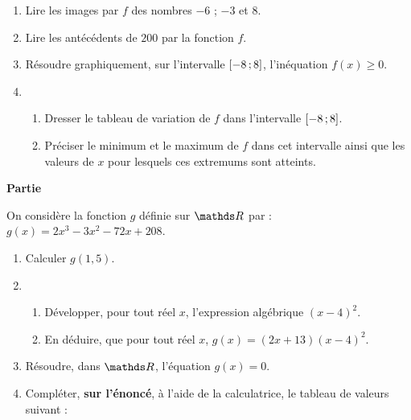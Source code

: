 \documentclass[12pt,french]{article}
\begin{document}
\begin{enumerate}[label=\arabic*.]
\item Lire les images par $f$ des nombres $-6$ ; $-3$ et $8$.

\item Lire les antécédents de $200$ par la fonction $f$.

\item Résoudre graphiquement, sur l'intervalle $\left[-8\,;8\right]$, l'inéquation $f(x)\geq 0$.

\item 	\begin{enumerate}[label=\alph*)]
	\item Dresser le tableau de variation de $f$ dans l'intervalle $\left[-8\,;8\right]$.
	
	\item Préciser le minimum et le maximum de $f$ dans cet intervalle ainsi que les valeurs de $x$ pour lesquels ces extremums sont atteints.
	
	\end{enumerate}

\end{enumerate}


\medskip\textbf{Partie} 

On considère la fonction $g$ définie sur $\R$ par : $g(x)=2x^3-3x^2-72x+208$.

\begin{enumerate}[label=\arabic*.]
\item Calculer $g(1,5)$.

\item 	\begin{enumerate}[label=\alph*)]
	\item Développer, pour tout réel $x$, l'expression algébrique $(x-4)^2$.
	
	\item En déduire, que pour tout réel $x$, $g(x)=(2x+13)(x-4)^2$.
	
	\end{enumerate}

\item Résoudre, dans $\R$, l'équation $g(x)=0$.

\item Compléter, \textbf{sur l'énoncé}, à l'aide de la calculatrice, le tableau de valeurs suivant :

\end{enumerate}
\end{document}
